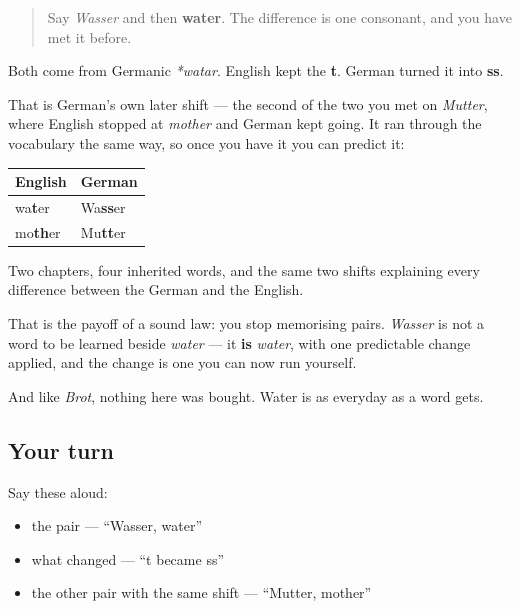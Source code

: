 \begin{quote}
Say \emph{Wasser} and then \textbf{water}. The difference is one consonant, and you have met it before.
\end{quote}

\begin{cousinweb}
Both come from Germanic \emph{*watar}. English kept the \textbf{t}. German turned it into \textbf{ss}.

That is German's own later shift — the second of the two you met on \emph{Mutter}, where English stopped at \emph{mother} and German kept going. It ran through the vocabulary the same way, so once you have it you can predict it:

\noindent
\begin{tabularx}{\linewidth}{@{}>{\raggedright\arraybackslash}X>{\raggedright\arraybackslash}X@{}}
\toprule
\textbf{English} & \textbf{German} \\
\midrule
wa\textbf{t}er & Wa\textbf{ss}er \\
mo\textbf{th}er & Mu\textbf{tt}er \\
\bottomrule
\end{tabularx}
\end{cousinweb}

\begin{culture}
Two chapters, four inherited words, and the same two shifts explaining every difference between the German and the English.

That is the payoff of a sound law: you stop memorising pairs. \emph{Wasser} is not a word to be learned beside \emph{water} — it \textbf{is} \emph{water}, with one predictable change applied, and the change is one you can now run yourself.

And like \emph{Brot}, nothing here was bought. Water is as everyday as a word gets.
\end{culture}

\subsection*{Your turn}
Say these aloud:

\begin{itemize}
\raggedright
  \item the pair — \textquotedblleft{}Wasser, water\textquotedblright{}
  \item what changed — \textquotedblleft{}t became ss\textquotedblright{}
  \item the other pair with the same shift — \textquotedblleft{}Mutter, mother\textquotedblright{}
\end{itemize}

